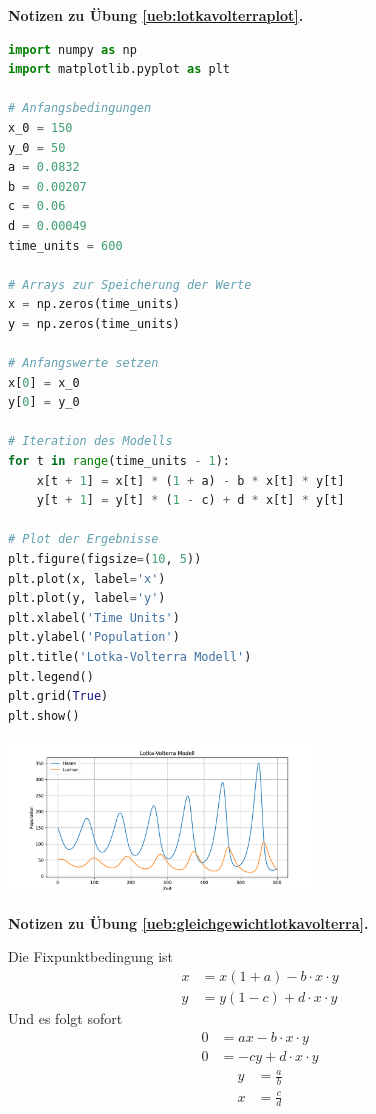 \documentclass[%
11pt,%
twoside,%
titlepage,%
german,%
headsepline%
]{scrartcl}
\newcommand{\concatueb}[1]{ueb:#1}%
\newcommand{\concatlsg}[1]{lsg:#1}%
\newenvironment{lsg}[1]{%
    \par\noindent\textbf{Notizen zu Übung \ref{\concatueb{#1}}.}%
    \label{\concatlsg{#1}}
}{%
    \par%
}
\begin{document}
\begin{lsg}{lotkavolterraplot}
    \begin{lstlisting}[language=python]
import numpy as np
import matplotlib.pyplot as plt

# Anfangsbedingungen
x_0 = 150
y_0 = 50
a = 0.0832
b = 0.00207
c = 0.06
d = 0.00049
time_units = 600

# Arrays zur Speicherung der Werte
x = np.zeros(time_units)
y = np.zeros(time_units)

# Anfangswerte setzen
x[0] = x_0
y[0] = y_0

# Iteration des Modells
for t in range(time_units - 1):
    x[t + 1] = x[t] * (1 + a) - b * x[t] * y[t]
    y[t + 1] = y[t] * (1 - c) + d * x[t] * y[t]

# Plot der Ergebnisse
plt.figure(figsize=(10, 5))
plt.plot(x, label='x')
plt.plot(y, label='y')
plt.xlabel('Time Units')
plt.ylabel('Population')
plt.title('Lotka-Volterra Modell')
plt.legend()
plt.grid(True)
plt.show()
\end{lstlisting}

\begin{center}
\includegraphics[width=0.618\textwidth]{pictures/hasenluchsepdf.pdf}
\end{center}

\end{lsg}

\begin{lsg}{gleichgewichtlotkavolterra}
Die Fixpunktbedingung ist
\begin{align*}
x &= x(1+a)-b\cdot x\cdot y\\
y &= y(1-c)+d\cdot x\cdot y
\end{align*}
Und es folgt sofort
\begin{align*}
0 &= ax-b\cdot x\cdot y\\
0 &= -cy+d\cdot x\cdot y
\end{align*}
\begin{align*}
y &= \frac{a}{b}\\
x &= \frac{c}{d}
\end{align*}
\end{lsg}
\end{document}
